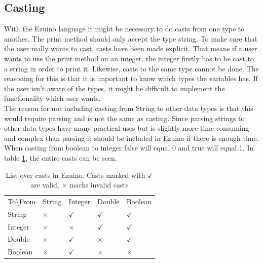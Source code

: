 \subsection*{Casting}
With the Ezuino language it might be necessary to do casts from one type to another.
The print method should only accept the type string. To make sure that the user really wants to cast, casts have been made explicit.
That means if a user wants to use the print method on an integer, the integer firstly has to be cast to a string in order to print it.
Likewise, casts to the same type cannot be done. The reasoning for this is that it is important to know which types the variables has. If the user isn't aware of the types, it might be difficult to implement the functionality which user wants.\\
The reason for not including casting from String to other data types is that this would require parsing and is not the same as casting. Since parsing strings to other data types have many practical uses but is slightly more time consuming and complex than parsing it should be included in Ezuino if there is enough time.  \\
When casting from boolean to integer false will equal 0 and true will equal 1.
In table \ref{tab:cast-overview}, the entire casts can be seen.
\begin{table}[H]
\centering
\begin{tabular}{lllll}
To\textbackslash From & String   & Integer      & Double       & Boolean      \\
String                & $\times$ & $\checkmark$ & $\checkmark$ & $\checkmark$ \\
Integer               & $\times$ & $\times$     & $\checkmark$ & $\checkmark$ \\
Double                & $\times$ & $\checkmark$ & $\times$     & $\checkmark$ \\
Boolean               & $\times$ & $\checkmark$ & $\times$     & $\times$    
\end{tabular}
\caption{List over casts in Ezuino. Casts marked with $\checkmark$ are valid, $\times$ marks invalid casts}
\label{tab:cast-overview}
\end{table}